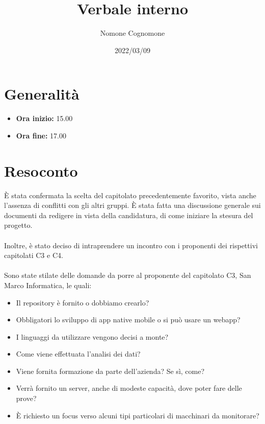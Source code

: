 \documentclass{classes/base}
\title{Verbale interno}
\date{2022/03/09}
\author{Nomone Cognomone}
\renewcommand{\maketitle}{
    
}
\begin{document}
    \maketitle

    \section{Generalità}
    \begin{itemize}
        \item \textbf{Ora inizio:} 15.00
        \item \textbf{Ora fine:} 17.00
    \end{itemize}

    \section{Resoconto}
    È stata confermata la scelta del capitolato precedentemente favorito, vista anche l'assenza di conflitti con gli altri gruppi.
    È stata fatta una discussione generale sui documenti da redigere in vista della candidatura, di come iniziare la stesura del progetto.
    \\\\
    Inoltre, è stato deciso di intraprendere un incontro con i proponenti dei rispettivi capitolati C3 e C4.
    \\\\
    Sono state stilate delle domande da porre al proponente del capitolato C3, San Marco Informatica, le quali:
    \begin{itemize}
        \item  Il repository è fornito o dobbiamo crearlo?
        \item  Obbligatori lo sviluppo di app native mobile o si può usare un webapp?
        \item  I linguaggi da utilizzare vengono decisi a monte? 
        \item  Come viene effettuata l'analisi dei dati?
        \item  Viene fornita formazione da parte dell'azienda? Se sì, come?
        \item  Verrà fornito un server, anche di modeste capacità, dove poter fare delle prove?
        \item  È richiesto un focus verso alcuni tipi particolari di macchinari da monitorare?
    \end{itemize}
\end{document}
